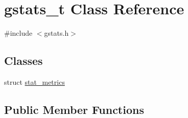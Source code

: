\hypertarget{classgstats__t}{}\section{gstats\+\_\+t Class Reference}
\label{classgstats__t}


{\ttfamily \#include $<$gstats.\+h$>$}

\subsection*{Classes}
\begin{DoxyCompactItemize}
\item 
struct \hyperlink{structgstats__t_1_1stat__metrics}{stat\+\_\+metrics}
\end{DoxyCompactItemize}
\subsection*{Public Member Functions}
